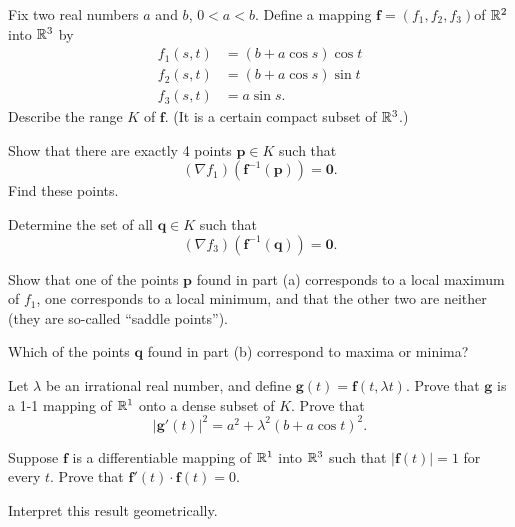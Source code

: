 \begin{myExercise}
    \label{ex:9.12}
    Fix two real numbers $a$ and $b$, $0 <a< b$. 
    Define a mapping $\mathbf{f} = (f_1,f_2,f_3)$of ${\protect\mathbb R}^2$ into ${\protect\mathbb R}^3$ by
    \begin{align*}
        f_1(s,t)&=(b+a\cos s)\cos t \\
        f_2(s,t)&=(b+a\cos s)\sin t \\
        f_3(s,t)&=a\sin s.
    \end{align*}
    Describe the range $K$ of $\mathbf{f}$. 
    (It is a certain compact subset of ${\protect\mathbb R}^3$.)
    \begin{asparaenum}[(a)]
        \item Show that there are exactly 4 points $\mathbf{p} \in K$ such that
        \begin{equation*}
            (\nabla f_1)(\mathbf{f}^{-1}(\mathbf{p})) = \mathbf{0}.
        \end{equation*}
        Find these points.
        \item Determine the set of all $\mathbf{q} \in K$ such that
        \begin{equation*}
            (\nabla f_3)(\mathbf{f}^{-1}(\mathbf{q})) = \mathbf{0}.
        \end{equation*}
        \item Show that one of the points $\mathbf{p}$ found in part (a) corresponds to a local maximum of $f_1$, 
        one corresponds to a local minimum, 
        and that the other two are neither 
        (they are so-called ``saddle points'').

        Which of the points $\mathbf{q}$ found in part (b) correspond to maxima or minima?
        \item Let $\lambda$  be an irrational real number, 
        and define $\mathbf{g}(t) = \mathbf{f}(t, \lambda t)$. 
        Prove that $\mathbf{g}$ is a 1-1 mapping of ${\protect\mathbb R}^1$ onto a dense subset of $K$. 
        Prove that
        \begin{equation*}
            \left| \mathbf{g}'(t) \right|^2 =
            a^2 + \lambda^2(b + a \cos t)^2 .
        \end{equation*}
    \end{asparaenum}
\end{myExercise}


\begin{myExercise}
    \label{ex:9.13}
    Suppose $\mathbf{f}$ is a differentiable mapping of ${\protect\mathbb R}^1$ into ${\protect\mathbb R}^3$ 
    such that $|\mathbf{f}(t)|=1$ for every $t$.
    Prove that $\mathbf{f}'(t) \cdot \mathbf{f}(t) = 0$.

    Interpret this result geometrically.
\end{myExercise}


